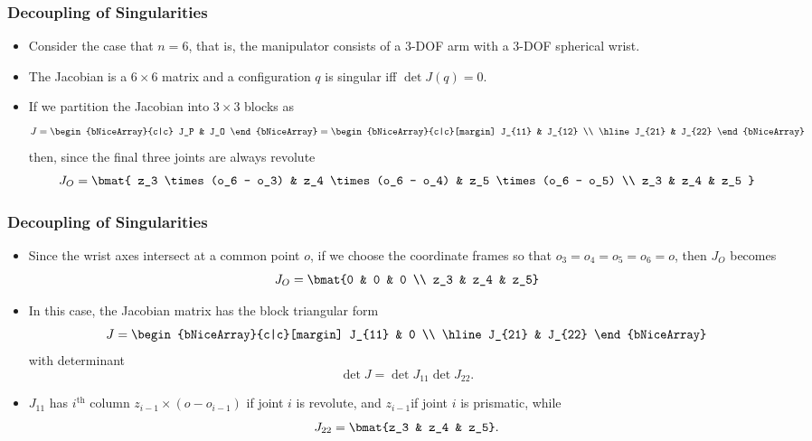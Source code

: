 \begin{frame}
    \frametitle{Decoupling of Singularities}

    \begin{itemize}
        \item Consider the case that $n=6$, that is, the manipulator consists of 
        a $3$-DOF arm with a $3$-DOF spherical wrist.
        \item The Jacobian is a $6 \times 6$ matrix and a configuration $q$ is
        singular iff $\det J(q) = 0$.
        \item If we partition the Jacobian into $3 \times 3$ blocks as 
        \[ J = \begin{bNiceArray}{c|c}
            J_P & J_O
        \end{bNiceArray} = 
        \begin{bNiceArray}{c|c}[margin]
            J_{11} & J_{12} \\ \hline
            J_{21} & J_{22}
        \end{bNiceArray} 
        \]
        then, since the final three joints are always revolute
        \[
        J_O = \bmat{
            z_3 \times (o_6 - o_3) & z_4 \times (o_6 - o_4) & z_5 \times (o_6 - o_5) \\
            z_3 & z_4 & z_5
        }    
        \]
    \end{itemize}
\end{frame}

\begin{frame}
    \frametitle{Decoupling of Singularities}

    \begin{itemize}
        \item Since the wrist axes intersect at a common point $o$, if we choose
        the coordinate frames so that $o_3 = o_4 = o_5 = o_6 = o$, then $J_O$
        becomes
        \[
        J_O = \bmat{0 & 0 & 0 \\ z_3 & z_4 & z_5}    
        \]
        \item In this case, the Jacobian matrix has the block triangular form 
        \[ J = \begin{bNiceArray}{c|c}[margin]
            J_{11} & 0 \\ \hline
            J_{21} & J_{22}
        \end{bNiceArray}  \]
        with determinant \[ \det J = \det J_{11} \det J_{22}. \]
        \item $J_{11}$ has $i^{\textrm{th}}$ column $z_{i-1} \times (o -
        o_{i-1})$ if joint $i$ is revolute, and $z_{i-1}$if joint $i$ is
        prismatic, while \[ J_{22} = \bmat{z_3 & z_4 & z_5}. \]
    \end{itemize}
\end{frame}


